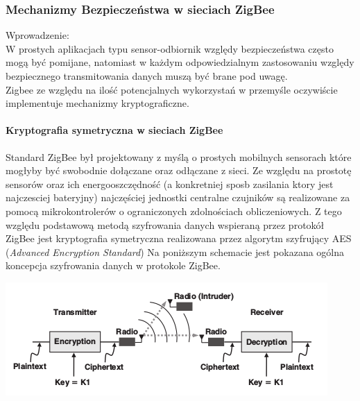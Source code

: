\subsubsection{Mechanizmy Bezpieczeństwa w sieciach ZigBee}

\par Wprowadzenie: \\
\tab W prostych aplikacjach typu sensor-odbiornik względy bezpieczeństwa często mogą być pomijane, natomiast w każdym odpowiedzialnym zastosowaniu względy bezpiecznego transmitowania danych muszą być brane pod uwagę. \\
Zigbee ze względu na ilość potencjalnych wykorzystań w przemyśle oczywiście implementuje mechanizmy kryptograficzne.

\paragraph{Kryptografia symetryczna w sieciach ZigBee} 

\par Standard ZigBee był projektowany z myślą o prostych mobilnych sensorach które mogłyby być swobodnie dołączane oraz odłączane z sieci. Ze względu na prostotę sensorów oraz ich energooszczędność (a konkretniej sposb zasilania ktory jest najczesciej bateryjny) najczęściej jednostki centralne czujników są realizowane za pomocą mikrokontrolerów o ograniczonych zdolnościach obliczeniowych. Z tego względu podstawową metodą szyfrowania danych wspieraną przez protokół ZigBee jest kryptografia symetryczna realizowana przez algorytm szyfrujący AES (\textit{Advanced Encryption Standard})
Na poniższym schemacie jest pokazana ogólna koncepcja szyfrowania danych w protokole ZigBee. \\
\centerline{\includegraphics[scale=0.5]{./img/img_zigbee_aes}}


